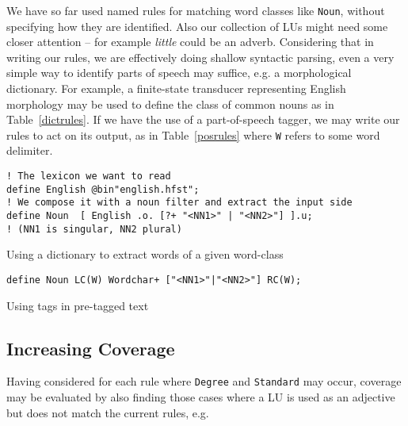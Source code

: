 \documentclass{llncs}
\begin{document}
We have so far used named rules for matching word classes like \verb+Noun+,
without specifying how they are identified. Also our collection of LUs might need
some closer attention -- for example \emph{little} could be an adverb.
Considering that in writing our
rules, we are effectively doing shallow syntactic parsing, even a very simple
way to identify parts of speech may suffice, e.g. a morphological dictionary.
For example, a finite-state transducer representing English morphology may be
used to define the class of common nouns as in Table~\ref{dictrules}.
If we have the use of a part-of-speech tagger, we may write our rules to act
on its output, as in Table~\ref{posrules} where \verb+W+ refers to some word delimiter.

\begin{table}[h]
\begin{center}
\small
  \begin{framed}
\begin{verbatim}
! The lexicon we want to read
define English @bin"english.hfst";
! We compose it with a noun filter and extract the input side
define Noun  [ English .o. [?+ "<NN1>" | "<NN2>"] ].u;
! (NN1 is singular, NN2 plural)
\end{verbatim}
\end{framed}
\end{center}
  \normalsize
  \caption{Using a dictionary to extract words of a given word-class}
  \label{dictrules}
  \end{table}

\begin{table}[h]
\begin{center}
  \small
  \begin{framed}
\begin{verbatim}
define Noun LC(W) Wordchar+ ["<NN1>"|"<NN2>"] RC(W);
\end{verbatim}
\end{framed}
\end{center}
  \normalsize
  \caption{Using tags in pre-tagged text}
  \label{posrules}
  \end{table}

\subsection{Increasing Coverage}
Having considered for each rule where \verb+Degree+ and \verb+Standard+ may occur, coverage may be evaluated by also finding those cases where a LU is used as an adjective but does not match the current rules, e.g.
\end{document}
